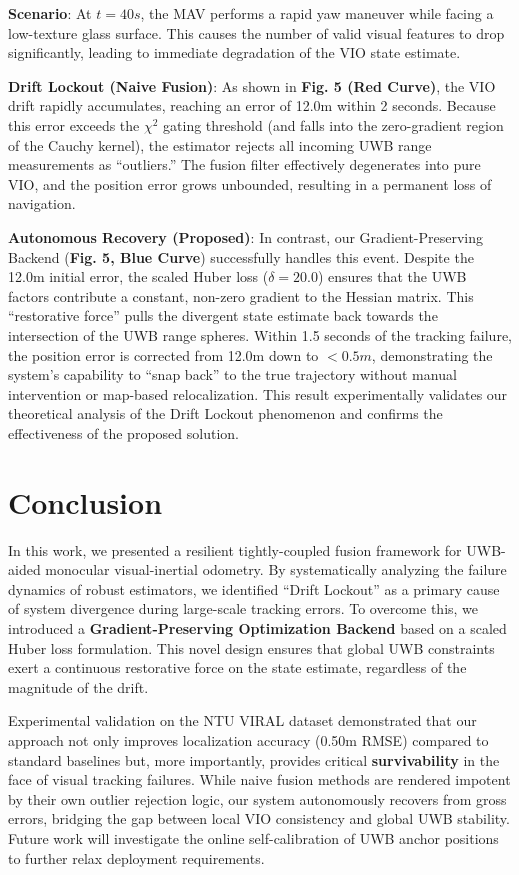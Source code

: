 \documentclass[conference]{IEEEtran}
\begin{document}
\textbf{Scenario}: At $t=40s$, the MAV performs a rapid yaw maneuver while facing a low-texture glass surface. This causes the number of valid visual features to drop significantly, leading to immediate degradation of the VIO state estimate.

\textbf{Drift Lockout (Naive Fusion)}:
As shown in \textbf{Fig. 5 (Red Curve)}, the VIO drift rapidly accumulates, reaching an error of 12.0m within 2 seconds. Because this error exceeds the $\chi^2$ gating threshold (and falls into the zero-gradient region of the Cauchy kernel), the estimator rejects all incoming UWB range measurements as ``outliers.'' The fusion filter effectively degenerates into pure VIO, and the position error grows unbounded, resulting in a permanent loss of navigation.

\textbf{Autonomous Recovery (Proposed)}:
In contrast, our Gradient-Preserving Backend (\textbf{Fig. 5, Blue Curve}) successfully handles this event. Despite the 12.0m initial error, the scaled Huber loss ($\delta=20.0$) ensures that the UWB factors contribute a constant, non-zero gradient to the Hessian matrix. This ``restorative force'' pulls the divergent state estimate back towards the intersection of the UWB range spheres. Within 1.5 seconds of the tracking failure, the position error is corrected from 12.0m down to $<0.5m$, demonstrating the system's capability to ``snap back'' to the true trajectory without manual intervention or map-based relocalization. This result experimentally validates our theoretical analysis of the Drift Lockout phenomenon and confirms the effectiveness of the proposed solution.

\section{Conclusion}
In this work, we presented a resilient tightly-coupled fusion framework for UWB-aided monocular visual-inertial odometry. By systematically analyzing the failure dynamics of robust estimators, we identified ``Drift Lockout'' as a primary cause of system divergence during large-scale tracking errors. To overcome this, we introduced a \textbf{Gradient-Preserving Optimization Backend} based on a scaled Huber loss formulation. This novel design ensures that global UWB constraints exert a continuous restorative force on the state estimate, regardless of the magnitude of the drift.

Experimental validation on the NTU VIRAL dataset demonstrated that our approach not only improves localization accuracy (0.50m RMSE) compared to standard baselines but, more importantly, provides critical \textbf{survivability} in the face of visual tracking failures. While naive fusion methods are rendered impotent by their own outlier rejection logic, our system autonomously recovers from gross errors, bridging the gap between local VIO consistency and global UWB stability. Future work will investigate the online self-calibration of UWB anchor positions to further relax deployment requirements.
\end{document}
